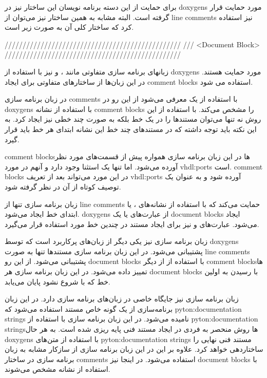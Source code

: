 برای حمایت از این دسته برنامه نویسان این ساختار نیز در \glspl{doxygen} مورد
حمایت قرار گرفته است. البته مشابه به همین ساختار نیز می‌توان از \glspl{line
comment} نیز استفاده کرد که ساختار کلی آن به صورت زیر است.

\begin{C++}
/////////////////////////////////////////////////
/// <Document Block>
/////////////////////////////////////////////////
\end{C++}


\begin{ebox}%
زبانهای برنامه سازی متفاوتی مانند ،  و  نیز با
استفاده از \glspl{doxygen} مورد حمایت هستند. در این زبان‌ها از ساختارهای متفاوتی
برای ایجاد \glspl{comment block} استفاده می شود.

در زبان برنامه سازی  \glspl{comment} با استفاده از یک \lr{-} معرفی
می‌شود از این رو در \glspl{doxygen} با استفاده از نشانه \lr{-!} \glspl{comment
block} را مشخص می‌کند. با استفاده از این روش نه تنها می‌توان مستندها را در یک خط
بلکه به صورت چند خطی نیز ایجاد کرد. به این نکته باید توجه داشته که در مستندهای
چند خط این نشانه ابتدای هر خط باید قرار گیرد.

\glspl{comment block}ها در این زبان برنامه سازی همواره پیش از قسمت‌های مورد نظر
آورده می‌شود. اما تنها یک استثنا وجود دارد و آنهم در مورد \glspl{vhdl:port} است.
\glspl{comment block} در این مورد می‌تواند بعد از تعریف \glspl{vhdl:port}
آورده شود و به عنوان یک توصیف کوتاه از آن در نظر گرفته شود.


زبان برنامه سازی  تنها از \glspl{line comment} حمایت می‌کند که با
استفاده از نشانه‌های \lr{*}،  یا \lr{!} ابتدای خط ایجاد می‌شود.
\glspl{doxygen} از عبارت‌های \lr{!>} یا \lr{!<} یک \glspl{document block} ایجاد
می‌شود. عبارت‌های \lr{!>}‌و \lr{!!} نیز برای ایجاد مستند در چندین خط مورد
استفاده قرار می‌گیرد.

زبان برنامه سازی  نیز یکی دیگر از زبان‌های پرکاربرد است که توسط
\glspl{doxygen} پشتیبانی می‌شود. در این زبان برنامه سازی مستندها تنها به صورت
\glspl{line comment} پشتیبانی می‌شود. از این رو \glspl{document block} با
استفاده از \lr{\#\#} از دیگر \glspl{comment block}ها تمییز داده می‌شود. در این
زبان برنامه سازی هر \glspl{document block} با رسیدن به اولین خط که با \lr{\#}
شروع نشود پایان می‌یابد.

زبان برنامه سازی  نیز جایگاه خاصی در زبان‌های برنامه سازی دارد. در
این زبان برنامه‌سازی از یک گونه خاص مستند استفاده می‌شود که
\glspl{pyton:documentation string} نامیده می‌شود. در این زبان برنامه سازی با
استفاده از \glspl{pyton:documentation string}ها روش منحصر به فردی در ایجاد مستند
فنی پایه ریزی شده است. به هر حال \glspl{doxygen} با استفاده از متن‌های
\glspl{pyton:documentation string} مستند فنی نهایی را ساختاردهی خواهد کرد. علاوه
بر این در این زبان برنامه سازی از سازکار مشابه به زبان برنامه سازی  در
ساختار \glspl{comment} استفاده می‌شود. در اینجا نیز \glspl{document block} با
استفاده از نشانه \lr{\#\#} مشخص می‌شوند.
\end{ebox}

